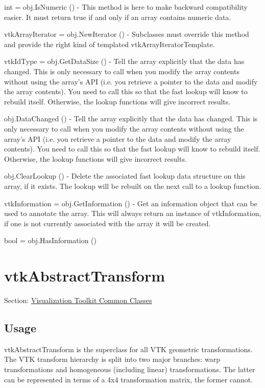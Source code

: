 \begin{DoxyItemize}
\item {\ttfamily int = obj.\-Is\-Numeric ()} -\/ This method is here to make backward compatibility easier. It must return true if and only if an array contains numeric data.  
\item {\ttfamily vtk\-Array\-Iterator = obj.\-New\-Iterator ()} -\/ Subclasses must override this method and provide the right kind of templated vtk\-Array\-Iterator\-Template.  
\item {\ttfamily vtk\-Id\-Type = obj.\-Get\-Data\-Size ()} -\/ Tell the array explicitly that the data has changed. This is only necessary to call when you modify the array contents without using the array's A\-P\-I (i.\-e. you retrieve a pointer to the data and modify the array contents). You need to call this so that the fast lookup will know to rebuild itself. Otherwise, the lookup functions will give incorrect results.  
\item {\ttfamily obj.\-Data\-Changed ()} -\/ Tell the array explicitly that the data has changed. This is only necessary to call when you modify the array contents without using the array's A\-P\-I (i.\-e. you retrieve a pointer to the data and modify the array contents). You need to call this so that the fast lookup will know to rebuild itself. Otherwise, the lookup functions will give incorrect results.  
\item {\ttfamily obj.\-Clear\-Lookup ()} -\/ Delete the associated fast lookup data structure on this array, if it exists. The lookup will be rebuilt on the next call to a lookup function.  
\item {\ttfamily vtk\-Information = obj.\-Get\-Information ()} -\/ Get an information object that can be used to annotate the array. This will always return an instance of vtk\-Information, if one is not currently associated with the array it will be created.  
\item {\ttfamily bool = obj.\-Has\-Information ()}  
\end{DoxyItemize}\hypertarget{vtkcommon_vtkabstracttransform}{}\section{vtk\-Abstract\-Transform}\label{vtkcommon_vtkabstracttransform}
Section\-: \hyperlink{sec_vtkcommon}{Visualization Toolkit Common Classes} \hypertarget{vtkwidgets_vtkxyplotwidget_Usage}{}\subsection{Usage}\label{vtkwidgets_vtkxyplotwidget_Usage}
vtk\-Abstract\-Transform is the superclass for all V\-T\-K geometric transformations. The V\-T\-K transform hierarchy is split into two major branches\-: warp transformations and homogeneous (including linear) transformations. The latter can be represented in terms of a 4x4 transformation matrix, the former cannot. 

